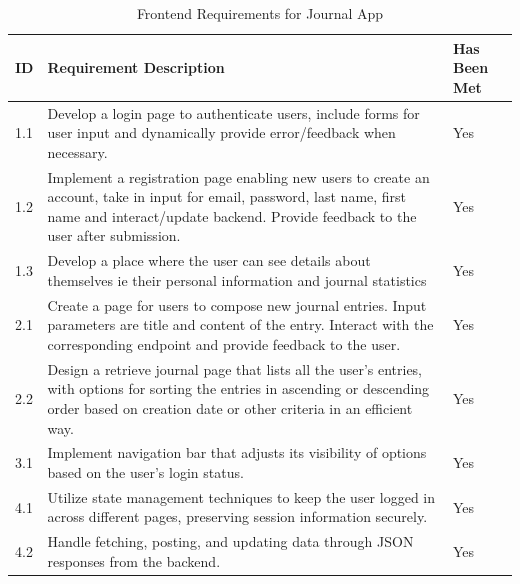 \begin{table}[H]
    \centering
    \begin{tabular}{|l|p{8cm}|p{4cm}|}
    \hline
    \textbf{ID} & \textbf{Requirement Description} & \textbf{Has Been Met}\\ \hline
    1.1 & Develop a login page to authenticate users, include forms for user input and dynamically provide error/feedback when necessary. & Yes \\ \hline
    
    1.2 & Implement a registration page enabling new users to create an account, take in input for email, password, last name, first name and interact/update backend. Provide feedback to the user after submission. & Yes\\ \hline
    
    1.3 & Develop a place where the user can see details about themselves ie their personal information and journal statistics & Yes\\ \hline
    
    2.1 & Create a page for users to compose new journal entries. Input parameters are title and content of the entry. Interact with the corresponding endpoint and provide feedback to the user.& Yes\\ \hline
    
    2.2 & Design a retrieve journal page that lists all the user’s entries, with options for sorting the entries in ascending or descending order based on creation date or other criteria in an efficient way. & Yes\\ \hline
    
    3.1 & Implement navigation bar that adjusts its visibility of options based on the user's login status. & Yes\\ \hline
    
    4.1 & Utilize state management techniques to keep the user logged in across different pages, preserving session information securely. & Yes\\ \hline
    
    4.2 & Handle fetching, posting, and updating data through JSON responses from the backend. & Yes \\ \hline
\end{tabular}
\caption{Frontend Requirements for Journal App}
\end{table}
    